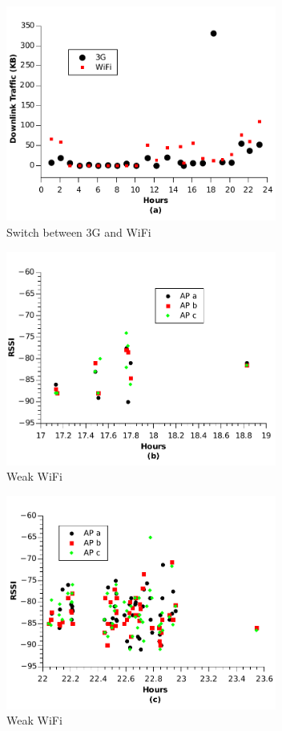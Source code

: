 \begin{figure}[h!tbp]
\centering
\includegraphics[width = 3.5in]{graphs/traffic_0202.pdf}
\caption{Switch between 3G and WiFi} 
\label{fig:switch}
\end{figure}

\begin{figure}[h!tbp]
\centering
\includegraphics[width = 3.5in]{graphs/weak_wifi_68.pdf}
\caption{Weak WiFi} 
\label{fig:weak_wifi_68}
\end{figure}

\begin{figure}[h!tbp]
\centering
\includegraphics[width = 3.5in]{graphs/weak_wifi_1012.pdf}
\caption{Weak WiFi} 
\label{fig:weak_wifi_1012}
\end{figure}

